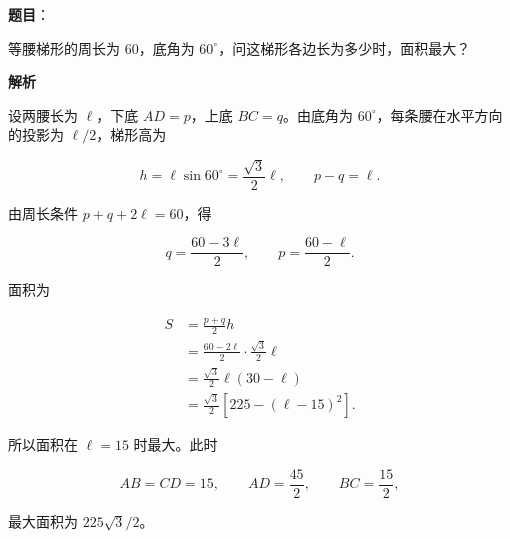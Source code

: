 \begin{answer}

\textbf{题目}：

等腰梯形的周长为 $60$，底角为 $60^\circ$，问这梯形各边长为多少时，面积最大？
\nopagebreak[4]
\begin{center}\end{center}
\nopagebreak[4]
\textbf{解析}

设两腰长为 $\ell$，下底 $AD=p$，上底 $BC=q$。由底角为 $60^\circ$，每条腰在水平方向的投影为 $\ell/2$，梯形高为

\nopagebreak[4]
\[
h=\ell\sin60^\circ=\frac{\sqrt3}{2}\ell,
\qquad p-q=\ell.
\]

由周长条件 $p+q+2\ell=60$，得

\nopagebreak[4]
\[
q=\frac{60-3\ell}{2},\qquad p=\frac{60-\ell}{2}.
\]

面积为

\nopagebreak[4]
\[
\begin{aligned}
S&=\frac{p+q}{2}h\\
&=\frac{60-2\ell}{2}\cdot\frac{\sqrt3}{2}\ell\\
&=\frac{\sqrt3}{2}\ell(30-\ell)\\
&=\frac{\sqrt3}{2}\left[225-(\ell-15)^2\right].
\end{aligned}
\]

所以面积在 $\ell=15$ 时最大。此时

\nopagebreak[4]
\[
AB=CD=15,\qquad AD=\frac{45}{2},\qquad BC=\frac{15}{2},
\]

最大面积为 $225\sqrt3/2$。


\end{answer}
